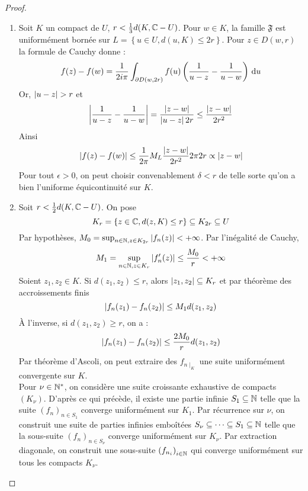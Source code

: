 \documentclass{cours}
\begin{document}
\begin{proof}
	\begin{enumerate}
		\item Soit $K$ un compact de $U$, $r < \frac{1}{3}d(K, \mathbb{C} - U)$. 
        Pour $w \in K$, la famille $\mathfrak{F}$ est uniformément bornée sur $L = \left\{u \in U, d(u, K) \leq 2r\right\}$.
        Pour $z \in D(w, r)$ la formule de Cauchy donne : 
        \[
            f(z) - f(w) = \frac{1}{2i\pi}\int_{\partial D(w, 2r)}f(u)\left(\frac{1}{u - z} - \frac{1}{u - w}\right){\rm \, d} u
        \]
        Or, $\left|u - z\right| > r$ et 
        \[
            \left|\frac{1}{u - z} - \frac{1}{u - w}\right| = \frac{\left|z - w\right|}{\left|u - z\right|2r} \leq \frac{\left|z - w\right|}{2r^{2}}
        \]
        Ainsi
        \[
            \left|f(z) - f(w)\right| \leq \frac{1}{2\pi} M_{L}\frac{\left|z - w\right|}{2r^{2}}2\pi 2r \propto\left|z - w\right|
        \]
        Pour tout $\epsilon > 0$, on peut choisir convenablement $\delta < r$ de telle sorte qu'on a bien l'uniforme équicontinuité sur $K$.
        \item Soit $r < \frac{1}{2}d(K, \mathbb{C} - U)$. On pose
        \[
            K_{r} = \left\{z \in \mathbb{C}, d(z, K) \leq r\right\} \subseteq K_{2r} \subseteq U
        \]
        Par hypothèses, $M_{0} = \sup_{n \in \mathbb{N}, z \in K_{2r}}\left|f_{n}(z)\right| < + \infty$. Par l'inégalité de Cauchy, 
        \[
            M_{1} = \sup_{n \in \mathbb{N}, z \in K_{r}} \left|f_{n}'(z)\right| \leq \frac{M_{0}}{r} < + \infty
        \]
        Soient $z_{1}, z_{2} \in K$. Si $d(z_{1}, z_{2}) \leq r$, alors $\left|z_{1}, z_{2}\right| \subseteq K_{r}$ et par théorème des accroissements finis
        \[
            \left|f_{n}(z_{1}) - f_{n}(z_{2})\right| \leq M_{1} d(z_{1}, z_{2})
        \]
        À l'inverse, si $d(z_{1}, z_{2}) \geq r$, on a : 
        \[
            \left|f_{n}(z_{1}) - f_{n}(z_{2})\right| \leq \frac{2M_{0}}{r}d(z_{1}, z_{2})
        \]
        Par théorème d'Ascoli, on peut extraire des $f_{n\mid_{K}}$ une suite uniformément convergente sur $K$. \\
        Pour $\nu \in \mathbb{N}^{*}$, on considère une suite croissante exhaustive de compacts $(K_{\nu})$. D'après ce qui précède, il existe une partie infinie $S_{1} \subseteq \mathbb{N}$ telle que la suite $(f_{n})_{n \in S_{1}}$ converge uniformément sur $K_{1}$. Par récurrence sur $\nu$, on construit une suite de parties infinies emboîtées $S_{\nu} \subseteq \cdots \subseteq S_{1} \subseteq \mathbb{N}$ telle que la sous-suite $(f_{n})_{n \in S_{\nu}}$ converge uniformément sur $K_{\nu}$. Par extraction diagonale, on construit une sous-suite $\left(f_{n_{i}}\right)_{i \in \mathbb{N}}$ qui converge uniformément sur tous les compacts $K_{\nu}$.
	\end{enumerate}
\end{proof}
\end{document}
